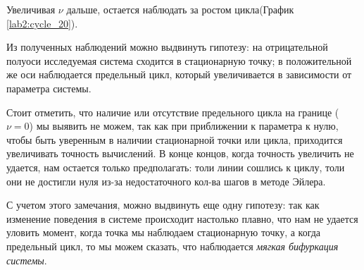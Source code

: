 Увеличивая $\nu$ дальше, остается наблюдать за ростом цикла(График
\ref{lab2:cycle_20}).

Из полученных наблюдений можно выдвинуть гипотезу: на отрицательной полуоси
исследуемая система сходится в стационарную точку; в положительной же оси
наблюдается предельный цикл, который увеличивается в зависимости от параметра
системы.

Стоит отметить, что наличие или отсутствие предельного цикла на границе
($\nu = 0$) мы выявить не можем, так как при приближении к параметра к нулю,
чтобы быть уверенным в наличии стационарной точки или цикла, приходится
увеличивать точность вычислений. В конце концов, когда точность увеличить
не удается, нам остается только предполагать: толи линии сошлись к циклу, толи
они не достигли нуля из-за недостаточного кол-ва шагов в методе Эйлера.

С учетом этого замечания, можно выдвинуть еще одну гипотезу: так как изменение
поведения в системе происходит настолько плавно, что нам не удается уловить
момент, когда точка мы наблюдаем стационарную точку, а когда предельный цикл,
то мы можем сказать, что наблюдается \textit{мягкая бифуркация системы}.

